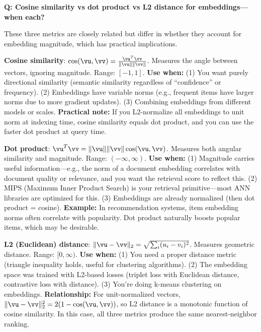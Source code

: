 \begin{interviewq}
\textbf{Q: Cosine similarity vs dot product vs L2 distance for embeddings---when each?}

 \quad {} \quad \badgefreq{\freqhigh}

\stronganswer

These three metrics are closely related but differ in whether they account for embedding magnitude, which has practical implications.

\textbf{Cosine similarity}: $\cos(\vu, \vv) = \frac{\vu^T\vv}{\|\vu\|\|\vv\|}$. Measures the angle between vectors, ignoring magnitude. Range: $[-1, 1]$. \textbf{Use when:} (1) You want purely directional similarity (semantic similarity regardless of ``confidence'' or frequency). (2) Embeddings have variable norms (e.g., frequent items have larger norms due to more gradient updates). (3) Combining embeddings from different models or scales. \textbf{Practical note:} If you L2-normalize all embeddings to unit norm at indexing time, cosine similarity equals dot product, and you can use the faster dot product at query time.

\textbf{Dot product}: $\vu^T\vv = \|\vu\|\|\vv\|\cos(\vu,\vv)$. Measures both angular similarity and magnitude. Range: $(-\infty, \infty)$. \textbf{Use when:} (1) Magnitude carries useful information---e.g., the norm of a document embedding correlates with document quality or relevance, and you want the retrieval score to reflect this. (2) MIPS (Maximum Inner Product Search) is your retrieval primitive---most ANN libraries are optimized for this. (3) Embeddings are already normalized (then dot product = cosine). \textbf{Example:} In recommendation systems, item embedding norms often correlate with popularity. Dot product naturally boosts popular items, which may be desirable.

\textbf{L2 (Euclidean) distance}: $\|\vu - \vv\|_2 = \sqrt{\sum_i(u_i-v_i)^2}$. Measures geometric distance. Range: $[0, \infty)$. \textbf{Use when:} (1) You need a proper distance metric (triangle inequality holds, useful for clustering algorithms). (2) The embedding space was trained with L2-based losses (triplet loss with Euclidean distance, contrastive loss with distance). (3) You're doing k-means clustering on embeddings. \textbf{Relationship:} For unit-normalized vectors, $\|\vu - \vv\|_2^2 = 2(1 - \cos(\vu,\vv))$, so L2 distance is a monotonic function of cosine similarity. In this case, all three metrics produce the same nearest-neighbor ranking.


\end{interviewq}
